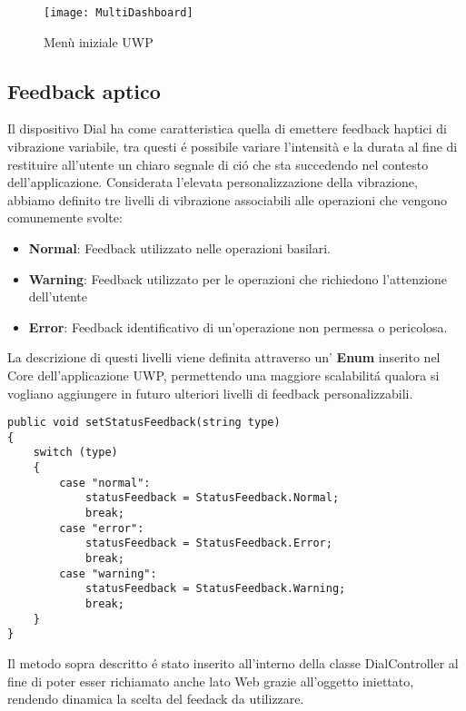 \begin{figure}[htpb!]
  \centering
  \texttt{[image: MultiDashboard]}
  \caption{Menù iniziale UWP}
\end{figure}

\subsection{Feedback aptico}
Il dispositivo Dial ha come caratteristica quella di emettere feedback haptici di vibrazione variabile, tra questi é possibile variare l'intensità e la durata al fine di restituire all'utente un chiaro segnale di ció che sta succedendo nel contesto dell'applicazione.
Considerata l'elevata personalizzazione della vibrazione, abbiamo definito tre livelli di vibrazione associabili alle operazioni che vengono comunemente svolte:

\begin{itemize}
\item \textbf{Normal}: Feedback utilizzato nelle operazioni basilari.
\item \textbf{Warning}: Feedback utilizzato per le operazioni che richiedono l'attenzione dell'utente
\item \textbf{Error}: Feedback identificativo di un'operazione non permessa o pericolosa.
\end{itemize} 

La descrizione di questi livelli viene definita attraverso un' \textbf{Enum} inserito nel Core dell'applicazione UWP, permettendo una maggiore scalabilitá qualora si vogliano aggiungere in futuro ulteriori livelli di feedback personalizzabili.

\vspace{1.0cm}
\begin{lstlisting}[caption={Selezione feedback corrente},style=javaScriptCode]
public void setStatusFeedback(string type)
{
	switch (type)
	{
		case "normal": 
			statusFeedback = StatusFeedback.Normal;
			break;
		case "error":
			statusFeedback = StatusFeedback.Error;
			break;
		case "warning":
			statusFeedback = StatusFeedback.Warning;
			break;
	}
}
\end{lstlisting} 
\vspace{1.0cm}

Il metodo sopra descritto é stato inserito all'interno della classe DialController al fine di poter esser richiamato anche lato Web grazie all'oggetto iniettato, rendendo dinamica la scelta del feedack da utilizzare.

